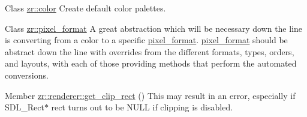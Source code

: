 
\begin{DoxyRefList}
\item[Class \mbox{\hyperlink{structzr_1_1color}{zr::color}} ]\label{todo__todo000001}%
%
Create default color palettes.  
\item[Class \mbox{\hyperlink{classzr_1_1pixel__format}{zr::pixel\+\_\+format}} ]\label{todo__todo000002}%
%
A great abstraction which will be necessary down the line is converting from a color to a specific \mbox{\hyperlink{classzr_1_1pixel__format}{pixel\+\_\+format}}. \mbox{\hyperlink{classzr_1_1pixel__format}{pixel\+\_\+format}} should be abstract down the line with overrides from the different formats, types, orders, and layouts, with each of those providing methods that perform the automated conversions.  
\item[Member \mbox{\hyperlink{classzr_1_1renderer_a1a93b15028f2bc27b2051bc912a70b4b}{zr::renderer::get\+\_\+clip\+\_\+rect}} ()]\label{todo__todo000003}%
%
This may result in an error, especially if S\+D\+L\+\_\+\+Rect$\ast$ rect turns out to be N\+U\+LL if clipping is disabled. 
\end{DoxyRefList}